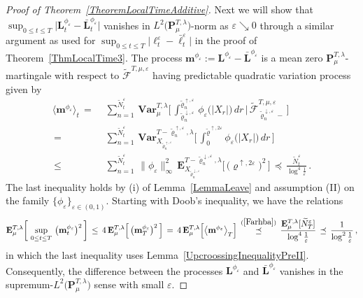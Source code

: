 \documentclass[10pt]{article}
\def\stackrel#1#2{\mathrel{\mathop{#2}\limits^{#1}}}
\numberwithin{equation}{section}
\theoremstyle{definition}
\begin{document}
\begin{proof}[Proof of Theorem~\ref{TheoremLocalTimeAdditive}]
    Next we will show that $\sup_{0\leq t\leq T}\big|\mathbf{L}_t^{\phi_\varepsilon} - \mathbf{\bar{L}}_t^{\phi_\varepsilon}\big| $ vanishes in $L^2\big(\mathbf{P}^{T,\lambda}_{\mu}\big)$-norm as $\varepsilon \searrow 0$  through a similar argument as  used for $\sup_{0\leq t\leq T}\big| \boldsymbol{\ell}_t^{\varepsilon}- \boldsymbol{\bar{\ell}}_t^{\varepsilon}\big| $ in the proof of Theorem~\ref{ThmLocalTime3}.  The process  $\mathbf{m}^{\phi_\varepsilon} :=\mathbf{L}^{\phi_\varepsilon} - \mathbf{\bar{L}}^{\phi_\varepsilon}$ is a mean zero  $\mathbf{P}^{T,\lambda}_{\mu}$-martingale with respect to $\widetilde{\mathscr{F}}^{T,\mu,\varepsilon}  $
     having predictable quadratic variation process given by 
\begin{align} \label{Farhba}
\big\langle \mathbf{m}^{\phi_\varepsilon} \big\rangle_t \,=\,&\, \sum_{n=1  }^{\widetilde{N}_{t}^{\varepsilon}} \,\mathbf{Var}^{T,\lambda}_{\mu}\Bigg[\,\int_{ \widetilde{\varrho}_{n}^{\downarrow,\varepsilon} }^{\widetilde{\varrho}_{n}^{\uparrow,\varepsilon}}    \,  \phi_{\varepsilon}\big(|X_r|\big)\,dr  \,\Bigg|\, \widetilde{\mathscr{F}}_{\widetilde{\varrho}_{n}^{\downarrow,\varepsilon}-}^{T,\mu,\varepsilon} \,\Bigg] \nonumber  \\
\,=\,&\, \sum_{n=1  }^{\widetilde{N}_{t}^{\varepsilon}} \,\mathbf{Var}^{T-\widetilde{\varrho}_{n}^{\uparrow,\varepsilon},\lambda}_{X_{\widetilde{\varrho}_{n}^{\uparrow,\varepsilon}} }\Bigg[\,\int_{0}^{\widetilde{\varrho}^{\uparrow,2\varepsilon}}      \phi_{\varepsilon}\big(|X_r|\big)\,dr \, \Bigg] \nonumber  \\
\,\leq\,&\, \sum_{n=1  }^{\widetilde{N}_{t}^{\varepsilon}}\, \|\phi_{\varepsilon}\|_{\infty}^2 \,\mathbf{E}^{T-\widetilde{\varrho}_{n}^{\downarrow,\varepsilon},\lambda}_{X_{\widetilde{\varrho}_{n}^{\downarrow,\varepsilon} }}\Big[\, \big(\varrho^{\uparrow,2\varepsilon}\big)^2\,\Big] \,\preceq\,  \frac{\widetilde{N}_{t}^{\varepsilon}}{\log^4 \frac{1}{\varepsilon}  }\,.
\end{align}
The last inequality holds  by (i) of Lemma~\ref{LemmaLeave} and assumption (II) on the family $\{\phi_{\varepsilon}\}_{\varepsilon\in (0,1)}$. Starting with  Doob's inequality, we  have the relations
\begin{align*}
\mathbf{E}^{T,\lambda}_{\mu}\bigg[\,\sup_{0\leq t\leq T}\, \big(\mathbf{m}^{\phi_\varepsilon}_t\big)^2  \, \bigg] \,\leq \,4 \,\mathbf{E}^{T,\lambda}_{\mu}\Big[ \,\big(\mathbf{m}^{\phi_\varepsilon}_T\big)^2   \,\Big]\, =\,4\, \mathbf{E}^{T,\lambda}_{\mu}\Big[ \big\langle \mathbf{m}^{\phi_\varepsilon}\big\rangle_T  \Big] \,\stackrel{(\ref{Farhba})}{\preceq}\, \frac{\mathbf{E}^{T,\lambda}_{\mu}[ \widetilde{N}_T^{\varepsilon}] }{\log^4 \frac{1}{\varepsilon}  } \,\preceq  \, \frac{1}{\log^2 \frac{1}{\varepsilon}  }\,,
\end{align*}
in which   the last inequality uses Lemma~\ref{UpcroossingInequalityPreII}. Consequently, the difference between the processes $\mathbf{L}^{\phi_\varepsilon} $ and $\mathbf{\bar{L}}^{\phi_\varepsilon}$ vanishes in the  supremum-$L^2\big(\mathbf{P}^{T,\lambda}_{\mu}\big)$ sense with small $\varepsilon$.





\end{proof}
\end{document}
